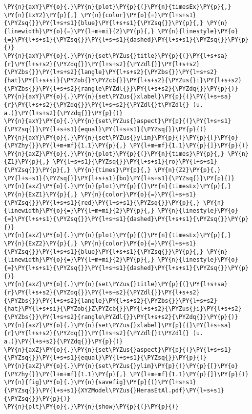 \begin{tcolorbox}[breakable, size=fbox, boxrule=1pt, pad at break*=1mm,colback=cellbackground, colframe=cellborder]
\begin{Verbatim}[commandchars=\\\{\}]
\PY{n}{axY}\PY{o}{.}\PY{n}{plot}\PY{p}{(}\PY{n}{timesEx}\PY{p}{,} \PY{n}{ExY2}\PY{p}{,} \PY{n}{color}\PY{o}{=}\PY{l+s+s1}{\PYZsq{}}\PY{l+s+s1}{blue}\PY{l+s+s1}{\PYZsq{}}\PY{p}{,} \PY{n}{linewidth}\PY{o}{=}\PY{l+m+mi}{2}\PY{p}{,} \PY{n}{linestyle}\PY{o}{=}\PY{l+s+s1}{\PYZsq{}}\PY{l+s+s1}{dashed}\PY{l+s+s1}{\PYZsq{}}\PY{p}{)}
\PY{n}{axY}\PY{o}{.}\PY{n}{set\PYZus{}title}\PY{p}{(}\PY{l+s+sa}{r}\PY{l+s+s2}{\PYZdq{}}\PY{l+s+s2}{\PYZdl{}}\PY{l+s+s2}{\PYZbs{}}\PY{l+s+s2}{langle}\PY{l+s+s2}{\PYZbs{}}\PY{l+s+s2}{hat}\PY{l+s+si}{\PYZob{}Y\PYZcb{}}\PY{l+s+s2}{\PYZus{}i}\PY{l+s+s2}{\PYZbs{}}\PY{l+s+s2}{rangle\PYZdl{}}\PY{l+s+s2}{\PYZdq{}}\PY{p}{)}
\PY{n}{axY}\PY{o}{.}\PY{n}{set\PYZus{}xlabel}\PY{p}{(}\PY{l+s+sa}{r}\PY{l+s+s2}{\PYZdq{}}\PY{l+s+s2}{\PYZdl{}t\PYZdl{} (u. a.)}\PY{l+s+s2}{\PYZdq{}}\PY{p}{)}
\PY{n}{axY}\PY{o}{.}\PY{n}{set\PYZus{}aspect}\PY{p}{(}\PY{l+s+s1}{\PYZsq{}}\PY{l+s+s1}{equal}\PY{l+s+s1}{\PYZsq{}}\PY{p}{)}
\PY{n}{axY}\PY{o}{.}\PY{n}{set\PYZus{}ylim}\PY{p}{(}\PY{p}{[}\PY{o}{\PYZhy{}}\PY{l+m+mf}{1.1}\PY{p}{,} \PY{l+m+mf}{1.1}\PY{p}{]}\PY{p}{)}
\PY{n}{axZ}\PY{o}{.}\PY{n}{plot}\PY{p}{(}\PY{n}{times}\PY{p}{,} \PY{n}{Z1}\PY{p}{,} \PY{l+s+s1}{\PYZsq{}}\PY{l+s+s1}{ro}\PY{l+s+s1}{\PYZsq{}}\PY{p}{,} \PY{n}{times}\PY{p}{,} \PY{n}{Z2}\PY{p}{,} \PY{l+s+s1}{\PYZsq{}}\PY{l+s+s1}{bo}\PY{l+s+s1}{\PYZsq{}}\PY{p}{)}
\PY{n}{axZ}\PY{o}{.}\PY{n}{plot}\PY{p}{(}\PY{n}{timesEx}\PY{p}{,} \PY{n}{ExZ1}\PY{p}{,} \PY{n}{color}\PY{o}{=}\PY{l+s+s1}{\PYZsq{}}\PY{l+s+s1}{red}\PY{l+s+s1}{\PYZsq{}}\PY{p}{,} \PY{n}{linewidth}\PY{o}{=}\PY{l+m+mi}{2}\PY{p}{,} \PY{n}{linestyle}\PY{o}{=}\PY{l+s+s1}{\PYZsq{}}\PY{l+s+s1}{dashed}\PY{l+s+s1}{\PYZsq{}}\PY{p}{)}
\PY{n}{axZ}\PY{o}{.}\PY{n}{plot}\PY{p}{(}\PY{n}{timesEx}\PY{p}{,} \PY{n}{ExZ2}\PY{p}{,} \PY{n}{color}\PY{o}{=}\PY{l+s+s1}{\PYZsq{}}\PY{l+s+s1}{blue}\PY{l+s+s1}{\PYZsq{}}\PY{p}{,} \PY{n}{linewidth}\PY{o}{=}\PY{l+m+mi}{2}\PY{p}{,} \PY{n}{linestyle}\PY{o}{=}\PY{l+s+s1}{\PYZsq{}}\PY{l+s+s1}{dashed}\PY{l+s+s1}{\PYZsq{}}\PY{p}{)}
\PY{n}{axZ}\PY{o}{.}\PY{n}{set\PYZus{}title}\PY{p}{(}\PY{l+s+sa}{r}\PY{l+s+s2}{\PYZdq{}}\PY{l+s+s2}{\PYZdl{}}\PY{l+s+s2}{\PYZbs{}}\PY{l+s+s2}{langle}\PY{l+s+s2}{\PYZbs{}}\PY{l+s+s2}{hat}\PY{l+s+si}{\PYZob{}Z\PYZcb{}}\PY{l+s+s2}{\PYZus{}i}\PY{l+s+s2}{\PYZbs{}}\PY{l+s+s2}{rangle\PYZdl{}}\PY{l+s+s2}{\PYZdq{}}\PY{p}{)}
\PY{n}{axZ}\PY{o}{.}\PY{n}{set\PYZus{}xlabel}\PY{p}{(}\PY{l+s+sa}{r}\PY{l+s+s2}{\PYZdq{}}\PY{l+s+s2}{\PYZdl{}t\PYZdl{} (u. a.)}\PY{l+s+s2}{\PYZdq{}}\PY{p}{)}
\PY{n}{axZ}\PY{o}{.}\PY{n}{set\PYZus{}aspect}\PY{p}{(}\PY{l+s+s1}{\PYZsq{}}\PY{l+s+s1}{equal}\PY{l+s+s1}{\PYZsq{}}\PY{p}{)}
\PY{n}{axZ}\PY{o}{.}\PY{n}{set\PYZus{}ylim}\PY{p}{(}\PY{p}{[}\PY{o}{\PYZhy{}}\PY{l+m+mf}{1.1}\PY{p}{,} \PY{l+m+mf}{1.1}\PY{p}{]}\PY{p}{)}
\PY{n}{fig}\PY{o}{.}\PY{n}{savefig}\PY{p}{(}\PY{l+s+s1}{\PYZsq{}}\PY{l+s+s1}{XYZModel\PYZus{}HerasEtAl.pdf}\PY{l+s+s1}{\PYZsq{}}\PY{p}{)}
\PY{n}{plt}\PY{o}{.}\PY{n}{show}\PY{p}{(}\PY{p}{)}
\end{Verbatim}
\end{tcolorbox}


